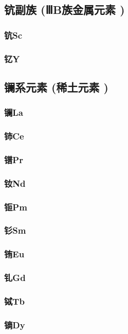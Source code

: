 \documentclass[UTF8]{../03-Chemistry}
\begin{document}
    \subsection{钪副族 (ⅢB族金属元素 )}
        \subsubsection{钪Sc}
        \subsubsection{钇Y}
    \subsection{镧系元素 (稀土元素 )}
        \subsubsection{镧La}
        \subsubsection{铈Ce}
        \subsubsection{镨Pr}
        \subsubsection{钕Nd}
        \subsubsection{钷Pm}
        \subsubsection{钐Sm}
        \subsubsection{铕Eu}
        \subsubsection{钆Gd}
        \subsubsection{铽Tb}
        \subsubsection{镝Dy}
\end{document}
